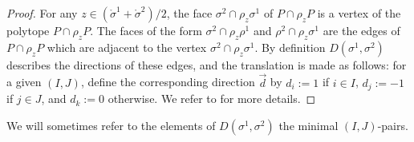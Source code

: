 \begin{proof}
    For any $z \in (\mathring \sigma^1+ \mathring \sigma^2)/2$, the face $\sigma^2 \cap \rho_z \sigma^1$ of $P \cap \rho_z P$ is a vertex of the polytope $P \cap \rho_z P$.
    The faces of the form $\sigma^2 \cap \rho_z \rho^1$ and $\rho^2 \cap \rho_z \sigma^1$ are the edges of $P\cap \rho_z P$ which are adjacent to the vertex $\sigma^2 \cap \rho_z \sigma^1$. 
    By definition $D(\sigma^1, \sigma^2)$ describes the directions of these edges, and the translation is made as follows: for a given $(I,J)$, define the corresponding direction $\vec d$ by $d_i:=1$ if $i \in I$, $d_j:=-1$ if $j \in J$, and $d_k:=0$ otherwise.  
    We refer to \cite[Section 1.5]{LA21} for more details.
\end{proof}


We will sometimes refer to the elements of $D(\sigma^1,\sigma^2)$ the minimal $(I,J)$-pairs.


